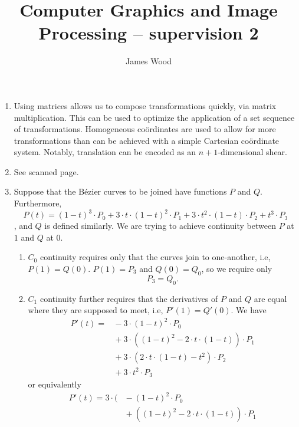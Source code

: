\documentclass{article}
\begin{document}
\title{Computer Graphics and Image Processing -- supervision 2}
\author{James Wood}
\maketitle

\begin{enumerate}
  \item Using matrices allows us to compose transformations quickly, via matrix multiplication. This can be used to optimize the application of a set sequence of transformations.
    Homogeneous co\"ordinates are used to allow for more transformations than can be achieved with a simple Cartesian co\"ordinate system. Notably, translation can be encoded as an $n+1$-dimensional shear.
  \item See scanned page.
  \item
    Suppose that the B\'ezier curves to be joined have functions $P$ and $Q$. Furthermore, \[
      P(t) = (1-t)^3 \cdot P_0 + 3 \cdot t \cdot (1-t)^2 \cdot P_1 + 3 \cdot t^2 \cdot (1-t) \cdot P_2 + t^3 \cdot P_3
    \], and $Q$ is defined similarly. We are trying to achieve continuity between $P$ at $1$ and $Q$ at $0$.
    \begin{enumerate}
      \item $C_0$ continuity requires only that the curves join to one-another, i.e, $P(1) = Q(0)$. $P(1) = P_3$ and $Q(0) = Q_0$, so we require only
        \begin{equation}
          P_3 = Q_0. \tag{PQ0}
        \end{equation}
      \item
        $C_1$ continuity further requires that the derivatives of $P$ and $Q$ are equal where they are supposed to meet, i.e, $P'(1) = Q'(0)$. We have
        \begin{align*}
          P'(t) =& {} - 3 \cdot (1-t)^2 \cdot P_0
          \\
          & {} + 3 \cdot ((1-t)^2 - 2 \cdot t \cdot (1-t)) \cdot P_1
          \\
          & {} + 3 \cdot (2 \cdot t \cdot (1-t) - t^2) \cdot P_2
          \\
          & {} + 3 \cdot t^2 \cdot P_3
        \end{align*}
        or equivalently
        \begin{align*}
          P'(t) = 3 \cdot (& {} - (1-t)^2 \cdot P_0
          \\
          & {} + ((1-t)^2 - 2 \cdot t \cdot (1-t)) \cdot P_1
          \\

\end{align*}
\end{enumerate}
\end{enumerate}
\end{document}
